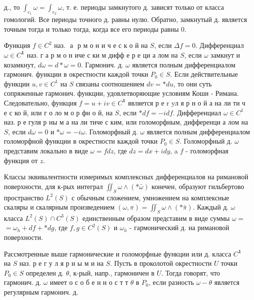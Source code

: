 \documentclass[10pt]{article}
\begin{document}
д., то $\int_{c_{1}} \omega=\int_{c_{2}} \omega$, т. е. периоды замкнутого д. зависят только от класса гомологий. Все периоды точного д. равны нулю. Обратно, замкнутый д. является точным тогда и только тогда, когда все его периоды равны 0.



Функция $f \in C^{2}$ наз. $\boldsymbol{\text { а }}$ р м о н и ч е с к о й на $S$, если $\Delta f=0$. Дифференциал $\omega \in C^{\mathbf{1}}$ наз. г а р м о н иче с ки м дифф е р е ци а лом на $S$, если $\omega$ замкнут и козамкнут, $d \omega=d * \omega=0$. Гармонич. д. $\omega$ является полным дифференциалом гармонич. функции в окрестности каждой точки $P_{0} \in S$. Если действительные функции $u, v \in C^{1}$ на $S$ связаны соотношением $d v=* d u$, то они суть сопряженные гармонич. функции, удовлетворяющие условиям Коши - Римана. Следовательно, функция $f=u+i v \in C^{\mathbf{1}}$ является р е r yл я р н о й а на ли ти ч е с ко й, или г о ло м о р фн о й, на $S$, если $* d f=-i d f$. Дифференциал $\omega \in C^{1}$ наз. р е гуля р ны м а на ли тиче с ким, или голоморфным, дифференци а лом на $S$, если $d \omega=0$ и $* \omega=-i \omega$. Голоморфный д. $\omega$ является полным дифференциалом голоморфной функции в окрестности каждой точки $P_{0} \in S$. Голоморфный д. $\omega$ представим локально в виде $\omega=f d z$, где $d z=d x+i d y$, a $f$ - голоморфная функция от $z$.



Классы эквивалентности измеримых комплексных дифференциалов на римановой поверхности, для к-рых интеграл $\iint_{S} \omega \wedge(* \bar{\omega})$ конечен, образуют гильбертово пространство $L^{2}(S)$ с обычным сложением, умножением на комплексные скаляры и скалярным произведением $(\omega, \pi)=\iint_{S} \omega \wedge(* \bar{\pi})$. Каждый д. $\omega$ класса $L^{2}(S) \cap C^{3}(S)$ единственным образом представим в виде суммы $\omega=$ $=\omega_{h}+d f+* d g$, где $f, g \in C^{2}(S)$ и $\omega_{h}$ - гармонический д. на римановой поверхности.



Рассмотренные выше гармонические и голоморфные функции или д. класса $C^{\mathbf{1}}$ на $S$ наз. р е г у л я р н ы м и на $S$. Пусть в проколотой окрестности $U$ точки $P_{0} \in S$ определен д. $\theta$, к-рый, напр., гармоничен в $U$. Тогда говорят, что гармонич. д. $\omega$ имеет о с о б е н н о с т т $\theta$ в $P_{0}$, если разность $\omega-\theta$ является регулярным гармонич. д.
\end{document}
